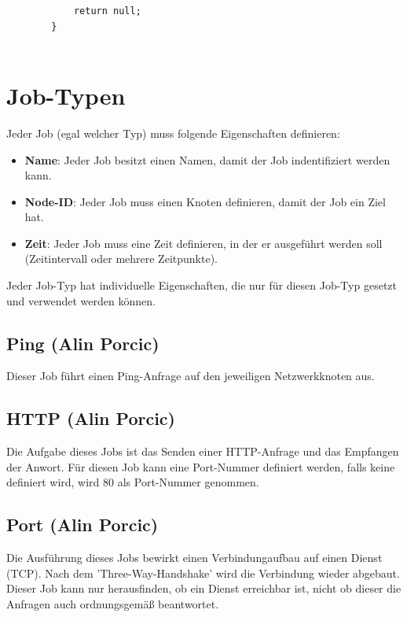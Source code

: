 \documentclass[12pt,a4paper]{report}
\begin{document}
\begin{onehalfspace}
\begin{lstlisting}
            return null;
        }
  
\end{lstlisting}

\section{Job-Typen}

Jeder Job (egal welcher Typ) muss folgende Eigenschaften definieren:\\

\begin{itemize}
\item \textbf{Name}: Jeder Job besitzt einen Namen, damit der Job indentifiziert werden kann.
\item \textbf{Node-ID}: Jeder Job muss einen Knoten definieren, damit der Job ein Ziel hat.
\item \textbf{Zeit}: Jeder Job muss eine Zeit definieren, in der er ausgeführt werden soll (Zeitintervall oder mehrere Zeitpunkte).
\end{itemize}

Jeder Job-Typ hat individuelle Eigenschaften, die nur für diesen Job-Typ gesetzt und verwendet werden können.

\subsection{Ping (Alin Porcic)} Dieser Job führt einen Ping-Anfrage auf den jeweiligen Netzwerkknoten aus.

\subsection{HTTP (Alin Porcic)} Die Aufgabe dieses Jobs ist das Senden einer HTTP-Anfrage und das Empfangen der Anwort. Für diesen Job kann eine Port-Nummer definiert werden, falls keine definiert wird, wird 80 als Port-Nummer genommen.

\subsection{Port (Alin Porcic)} Die Ausführung dieses Jobs bewirkt einen Verbindungaufbau auf einen Dienst (TCP). Nach dem 'Three-Way-Handshake' wird die Verbindung wieder abgebaut. Dieser Job kann nur herausfinden, ob ein Dienst erreichbar ist, nicht ob dieser die Anfragen auch ordnungsgemäß beantwortet.

\newpage
{}%


\end{onehalfspace}
\end{document}
